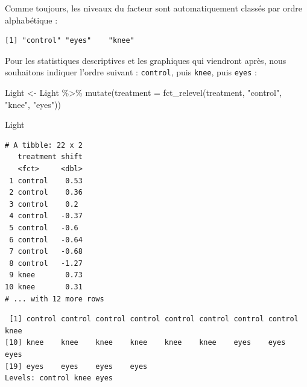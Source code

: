 \documentclass[
  a4paper,
]{article}
\newenvironment{Shaded}{\begin{snugshade}}{\end{snugshade}}
\newcommand{\AttributeTok}[1]{\textcolor[rgb]{0.00,0.34,0.68}{#1}}
\newcommand{\FunctionTok}[1]{\textcolor[rgb]{0.39,0.29,0.61}{#1}}
\newcommand{\NormalTok}[1]{\textcolor[rgb]{0.12,0.11,0.11}{#1}}
\newcommand{\OtherTok}[1]{\textcolor[rgb]{0.00,0.43,0.16}{#1}}
\newcommand{\SpecialCharTok}[1]{\textcolor[rgb]{0.24,0.68,0.91}{#1}}
\newcommand{\StringTok}[1]{\textcolor[rgb]{0.75,0.01,0.01}{#1}}
\begin{document}
Comme toujours, les niveaux du facteur sont automatiquement classés par ordre alphabétique :

\begin{Shaded}
\end{Shaded}

\begin{verbatim}
[1] "control" "eyes"    "knee"   
\end{verbatim}

Pour les statistiques descriptives et les graphiques qui viendront après, nous souhaitons indiquer l'ordre suivant : \texttt{control}, puis \texttt{knee}, puis \texttt{eyes} :

\begin{Shaded}
\begin{Highlighting}[]
\NormalTok{Light }\OtherTok{\textless{}{-}}\NormalTok{ Light }\SpecialCharTok{\%\textgreater{}\%} 
  \FunctionTok{mutate}\NormalTok{(}\AttributeTok{treatment =} \FunctionTok{fct\_relevel}\NormalTok{(treatment, }\StringTok{"control"}\NormalTok{, }\StringTok{"knee"}\NormalTok{, }\StringTok{"eyes"}\NormalTok{))}

\NormalTok{Light}
\end{Highlighting}
\end{Shaded}

\begin{verbatim}
# A tibble: 22 x 2
   treatment shift
   <fct>     <dbl>
 1 control    0.53
 2 control    0.36
 3 control    0.2 
 4 control   -0.37
 5 control   -0.6 
 6 control   -0.64
 7 control   -0.68
 8 control   -1.27
 9 knee       0.73
10 knee       0.31
# ... with 12 more rows
\end{verbatim}

\begin{Shaded}
\end{Shaded}

\begin{verbatim}
 [1] control control control control control control control control knee   
[10] knee    knee    knee    knee    knee    knee    eyes    eyes    eyes   
[19] eyes    eyes    eyes    eyes   
Levels: control knee eyes
\end{verbatim}
\end{document}
